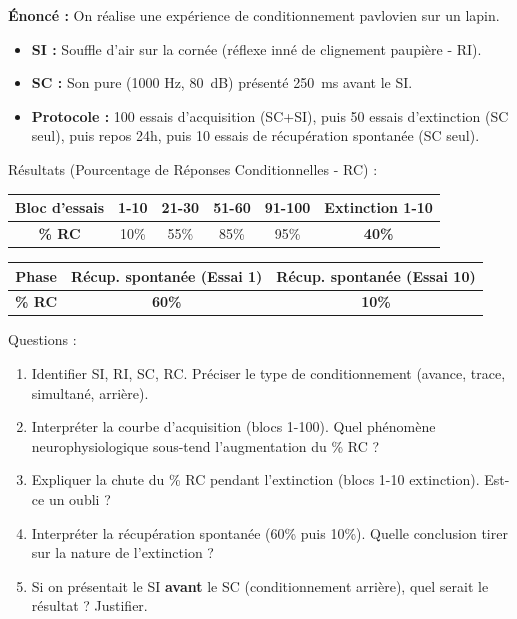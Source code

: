 \documentclass[11pt]{article}
\begin{document}
\begin{exoresolu}
\textbf{Énoncé :} On réalise une expérience de conditionnement pavlovien sur un lapin.
\begin{itemize}
    \item \textbf{SI :} Souffle d'air sur la cornée (réflexe inné de clignement paupière - RI).
    \item \textbf{SC :} Son pure (1000 Hz, \SI{80}{dB}) présenté \SI{250}{ms} avant le SI.
    \item \textbf{Protocole :} 100 essais d'acquisition (SC+SI), puis 50 essais d'extinction (SC seul), puis repos 24h, puis 10 essais de récupération spontanée (SC seul).
\end{itemize}
Résultats (Pourcentage de Réponses Conditionnelles - RC) :
\begin{center}
\begin{tabular}{|c|c|c|c|c|c|}\hline
\textbf{Bloc d'essais} & 1-10 & 21-30 & 51-60 & 91-100 & \textbf{Extinction 1-10} \\ \hline
\textbf{\% RC} & 10\% & 55\% & 85\% & 95\% & \textbf{40\%} \\ \hline
\end{tabular}
\end{center}
\begin{center}
\begin{tabular}{|c|c|c|}\hline
\textbf{Phase} & \textbf{Récup. spontanée (Essai 1)} & \textbf{Récup. spontanée (Essai 10)} \\ \hline
\textbf{\% RC} & \textbf{60\%} & \textbf{10\%} \\ \hline
\end{tabular}
\end{center}
Questions :
\begin{enumerate}
    \item Identifier SI, RI, SC, RC. Préciser le type de conditionnement (avance, trace, simultané, arrière).
    \item Interpréter la courbe d'acquisition (blocs 1-100). Quel phénomène neurophysiologique sous-tend l'augmentation du \% RC ?
    \item Expliquer la chute du \% RC pendant l'extinction (blocs 1-10 extinction). Est-ce un oubli ?
    \item Interpréter la récupération spontanée (60\% puis 10\%). Quelle conclusion tirer sur la nature de l'extinction ?
    \item Si on présentait le SI \textbf{avant} le SC (conditionnement arrière), quel serait le résultat ? Justifier.
\end{enumerate}


\end{exoresolu}
\end{document}
